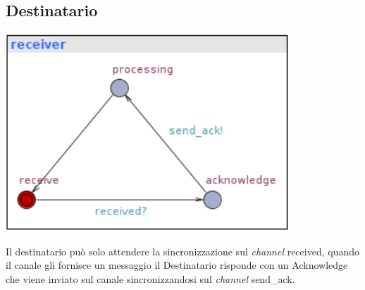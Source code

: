 \documentclass[a4paper]{article}
\newcommand{\channel}{\textit{channel }}
\begin{document}
\subsection{Destinatario} 
\begin{center}\includegraphics[width=0.8\textwidth]{1_receiver.png}\end{center}
Il destinatario può solo attendere la sincronizzazione sul \channel received, quando il canale gli fornisce un messaggio il Destinatario risponde con un Acknowledge che viene inviato sul canale sincronizzandosi sul \channel send\_ack.
\end{document}
